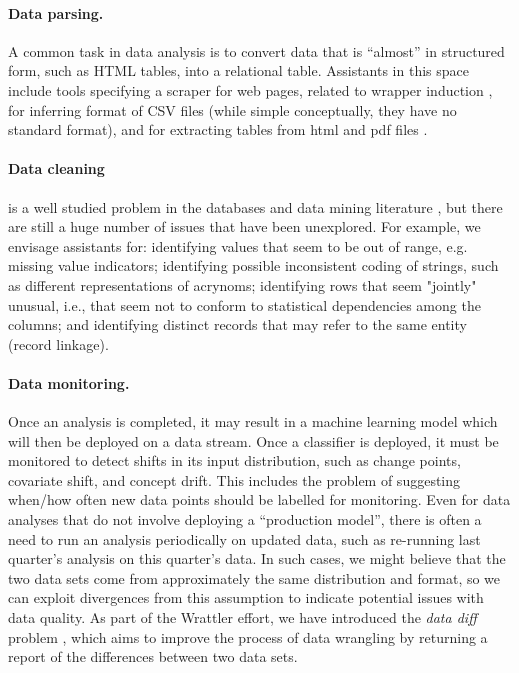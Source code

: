 \documentclass[sigplan,preprint,10pt]{acmart}\settopmatter{printfolios=true,printccs=false,printacmref=false}
\begin{document}
{{\paragraph{Data parsing.}
A common task in data analysis is to convert
data that is ``almost'' in structured form,
such as HTML tables, into a relational table.
Assistants in this space include
tools specifying a scraper for web pages, related
to wrapper induction \cite{Kushmerick1997WrapperIF},
for inferring format of CSV files (while simple
conceptually, they have no standard format), and
for extracting tables from html and pdf files
\cite{pinto03table}.

\paragraph{Data cleaning} is a well studied
problem in the databases and data mining literature
\cite{abedjan2016detecting,ilyas2015},
but there are still a huge number of issues that have been unexplored.
For example, we envisage assistants for:
identifying values that seem to be out of range, e.g. missing value indicators;
identifying possible inconsistent coding of strings,
such as different representations of acrynoms;
identifying rows that seem "jointly" unusual, i.e., that seem not to conform to statistical dependencies among the columns; and
identifying distinct records that may refer to the same entity (record linkage).

\paragraph{Data monitoring.} Once an analysis
is completed, it may result in a machine learning
model which will then be deployed on a data stream.
Once a classifier is deployed, it must be monitored
to detect shifts in its input distribution,
such as change points, covariate shift, and
concept drift. This includes the problem
of suggesting when/how often new data points should be labelled for monitoring.
Even for data analyses that do not involve
deploying a ``production model'', there is
often a need to run an analysis periodically on updated data, such as
re-running last quarter's analysis on this quarter's data.
In such cases, we might believe that the two data
sets come from approximately the same distribution
and format, so we can exploit
divergences from this assumption to indicate
potential issues with data quality.
As part of the Wrattler effort, we have
introduced the \emph{data diff} problem \cite{datadiff},
which aims to improve the process of data wrangling by
returning a report of the differences between two data sets.

}}
\end{document}
